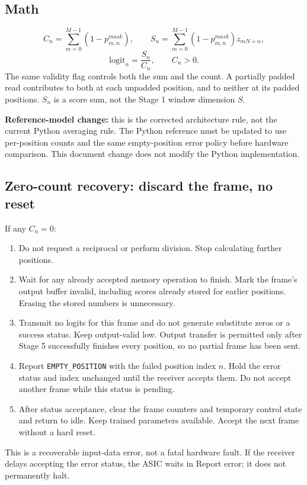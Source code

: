 \documentclass[11pt,a4paper]{article}
\begin{document}
\subsection*{Math}
\[
C_n=\sum_{m=0}^{M-1}(1-p^{mask}_{m,n}),\qquad
S_n=\sum_{m=0}^{M-1}(1-p^{mask}_{m,n})z_{mN+n},
\]
\[
\mathrm{logit}_n=\frac{S_n}{C_n},\qquad C_n>0.
\]
The same validity flag controls both the sum and the count. A partially padded read contributes to both at each unpadded position, and to neither at its padded positions. $S_n$ is a score sum, not the Stage 1 window dimension $S$.

\textbf{Reference-model change:} this is the corrected architecture rule, not the current Python averaging rule. The Python reference must be updated to use per-position counts and the same empty-position error policy before hardware comparison. This document change does not modify the Python implementation.

\subsection*{Zero-count recovery: discard the frame, no reset}
If any $C_n=0$:
\begin{enumerate}[leftmargin=*]
\item Do not request a reciprocal or perform division. Stop calculating further positions.
\item Wait for any already accepted memory operation to finish. Mark the frame's output buffer invalid, including scores already stored for earlier positions. Erasing the stored numbers is unnecessary.
\item Transmit no logits for this frame and do not generate substitute zeros or a success status. Keep output-valid low. Output transfer is permitted only after Stage 5 successfully finishes every position, so no partial frame has been sent.
\item Report \texttt{EMPTY\_POSITION} with the failed position index $n$. Hold the error status and index unchanged until the receiver accepts them. Do not accept another frame while this status is pending.
\item After status acceptance, clear the frame counters and temporary control state and return to idle. Keep trained parameters available. Accept the next frame without a hard reset.
\end{enumerate}
This is a recoverable input-data error, not a fatal hardware fault. If the receiver delays accepting the error status, the ASIC waits in Report error; it does not permanently halt.
\end{document}
